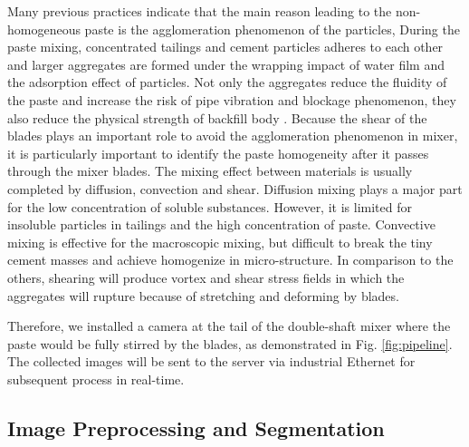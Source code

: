 \documentclass[pdflatex,sn-mathphys]{sn-jnl}%
\theoremstyle{thmstyleone}%
\theoremstyle{thmstyletwo}%
\theoremstyle{thmstylethree}%
\begin{document}
Many previous practices indicate that the main reason leading to the non-homogeneous paste is the agglomeration phenomenon of the particles\cite{YANG2020118516}, 
During the paste mixing, concentrated tailings and cement particles adheres to each other and larger aggregates are formed under the wrapping impact of water film and the adsorption effect of particles\cite{QI2019106025}. 
Not only the aggregates reduce the fluidity of the paste and increase the risk of pipe vibration and blockage phenomenon, they also reduce the physical strength of backfill body \cite{tailingsManagement}.
Because the shear of the blades plays an important role to avoid the agglomeration phenomenon\cite{yang2019research} in mixer, it is particularly important to identify the paste homogeneity after it passes through the mixer blades. 
The mixing effect between materials is usually completed by diffusion, convection and shear\cite{lacey1954developments}. 
Diffusion mixing plays a major part for the low concentration of soluble substances.
However, it is limited for insoluble particles in tailings and the high concentration of paste.
Convective mixing is effective for the macroscopic mixing, but difficult to break the tiny cement masses and achieve homogenize in micro-structure. 
In comparison to the others, shearing will produce vortex and shear stress fields in which the aggregates will rupture because of stretching and deforming by blades.

Therefore, we installed a camera at the tail of the double-shaft mixer where the paste would be fully stirred by the blades, as demonstrated in Fig. \ref{fig:pipeline}. 
The collected images will be sent to the server via industrial Ethernet for subsequent process in real-time.


\subsection{Image Preprocessing and Segmentation}
\end{document}
